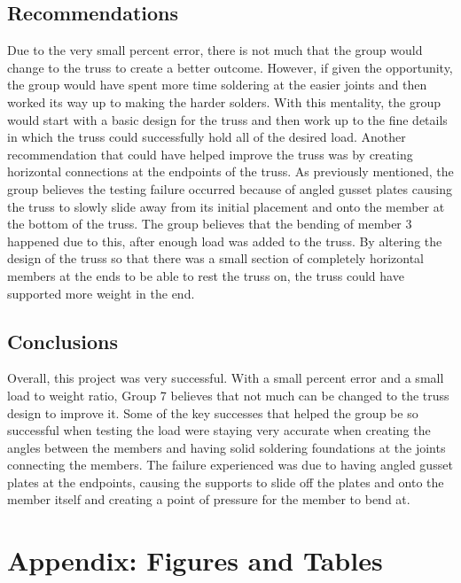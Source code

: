 \documentclass{article}
\begin{document}
\subsection{Recommendations}
Due to the very small percent error, there is not much that the group would change to the truss to create a better outcome. However, if given the opportunity, the group would have spent more time soldering at the easier joints and then worked its way up to making the harder solders. With this mentality, the group would start with a basic design for the truss and then work up to the fine details in which the truss could successfully hold all of the desired load. Another recommendation that could have helped improve the truss was by creating horizontal connections at the endpoints of the truss. As previously mentioned, the group believes the testing failure occurred because of angled gusset plates causing the truss to slowly slide away from its initial placement and onto the member at the bottom of the truss. The group believes that the bending of member 3 happened due to this, after enough load was added to the truss. By altering the design of the truss so that there was a small section of completely horizontal members at the ends to be able to rest the truss on, the truss could have supported more weight in the end. 

\subsection{Conclusions}
Overall, this project was very successful. With a small percent error and a small load to weight ratio, Group 7 believes that not much can be changed to the truss design to improve it. Some of the key successes that helped the group be so successful when testing the load were staying very accurate when creating the angles between the members and having solid soldering foundations at the joints connecting the members. The failure experienced was due to having angled gusset plates at the endpoints, causing the supports to slide off the plates and onto the member itself and creating a point of pressure for the member to bend at. 

\newpage
\setcounter{page}{1}
\renewcommand{\thepage}{A-\arabic{page}}
\section{Appendix: Figures and Tables}
\end{document}
